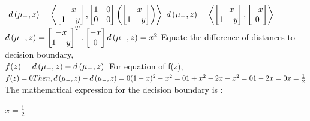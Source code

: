 \documentclass[a4paper,11pt]{article}
\begin{document}
\begin{mlsolution}
\begin{math}
\end{math}
\newline
\begin{math}
d\left ( \mu_{-}, \space z \right ) = \left \langle \begin{bmatrix} -x\\ 1-y \end{bmatrix} , \begin{bmatrix} 
1 & 0 \\ 0 & 0 \end{bmatrix} \left (  \begin{bmatrix} -x\\1 -y \end{bmatrix}  \right ) \right \rangle
\end{math}
\newline
\begin{math}
d\left ( \mu_{-}, \space z \right ) = \left \langle \begin{bmatrix} -x\\ 1-y \end{bmatrix} , \begin{bmatrix} -x \\ 0 \end{bmatrix} \right \rangle
\end{math}
\newline
\begin{math}
\\
d\left ( \mu_{-}, \space z \right ) = \begin{bmatrix} -x\\ 1-y \end{bmatrix} ^{T}.\begin{bmatrix} -x \\ 0 \end{bmatrix}\\ \\
d\left ( \mu_{-}, \space z \right ) = x^{2} \\
\end{math}
Equate the difference of distances to decision boundary,\\
\begin{math}
f(z) = d\left ( \mu_{+}, \space z \right ) - d\left ( \mu_{-}, \space z \right )\\
\end{math}
For equation of f(z),
\begin{math}
f(z) = 0 \\
Then, d\left ( \mu_{+}, \space z \right ) - d\left ( \mu_{-}, \space z \right ) = 0\\
(1-x)^{2} - x^{2} = 0\\
1 + x^{2} - 2x - x^{2} = 0\\
1 - 2x = 0\\
x = \frac{1}{2} \\
\end{math}\\
The mathematical expression for the decision boundary is :\\
\begin{center} \begin{math} \boxed{x = \frac{1}{2}} \end{math} \end{center}


\end{mlsolution}
\end{document}
